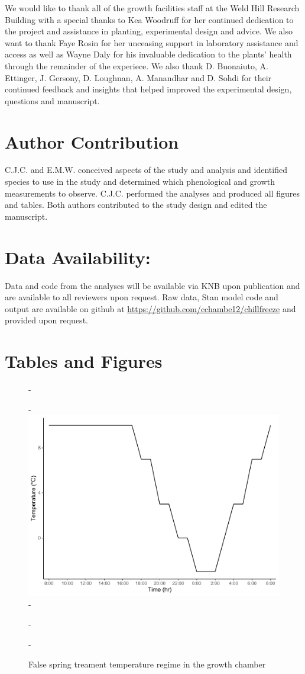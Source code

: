 \documentclass{article}\usepackage[]{graphicx}\usepackage[]{color}
\begin{document}
We would like to thank all of the growth facilities staff at the Weld Hill Research Building with a special thanks to Kea Woodruff for her continued dedication to the project and assistance in planting, experimental design and advice. We also want to thank Faye Rosin for her unceasing support in laboratory assistance and access as well as Wayne Daly for his invaluable dedication to the plants' health through the remainder of the experiece. We also thank D. Buonaiuto, A. Ettinger, J. Gersony, D. Loughnan, A. Manandhar and D. Sohdi for their continued feedback and insights that helped improved the experimental design, questions and manuscript.

\section*{Author Contribution}
C.J.C. and E.M.W. conceived aspects of the study and analysis and identified species to use in the study and determined which phenological and growth measurements to observe. C.J.C. performed the analyses and produced all figures and tables. Both authors contributed to the study design and edited the manuscript.

\section*{Data Availability:}
Data and code from the analyses will be available via KNB upon publication and are available to all reviewers upon request. Raw data, {Stan} model code and output are available on github at \url{https://github.com/cchambe12/chillfreeze} and provided upon request.




\section*{Tables and Figures}

{\begin{figure} [H]
  -\begin{center}
  -\includegraphics[width=12cm]{..//analyses/figures/growthchamber.pdf}
  -\caption{False spring treament temperature regime in the growth chamber}\label{fig:gccond}
  -\end{center}
  -\end{figure}}
  
\end{document}
